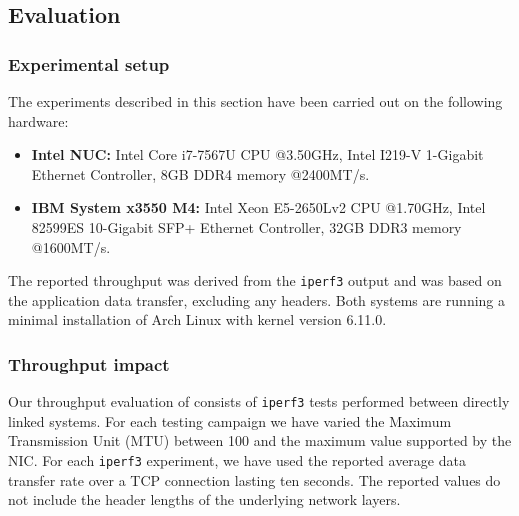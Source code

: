 \subsection{Evaluation}
\label{apffw:appscout:evaluation}


\subsubsection{Experimental setup}

The experiments described in this section have been carried out on the following hardware:

\begin{itemize}
    \item \textbf{Intel NUC:} Intel Core i7-7567U CPU @3.50GHz, Intel I219-V 1-Gigabit Ethernet Controller, 8GB DDR4 memory @2400MT/s.
    \item \textbf{IBM System x3550 M4:} Intel Xeon E5-2650Lv2 CPU @1.70GHz, Intel 82599ES 10-Gigabit SFP+ Ethernet Controller, 32GB DDR3 memory @1600MT/s.
\end{itemize}

The reported throughput was derived from the \texttt{iperf3} output and was based on the application data transfer, excluding any headers. Both systems are running a minimal installation of Arch Linux with kernel version 6.11.0.

\subsubsection{Throughput impact}

Our throughput evaluation of \scout{} consists of \texttt{iperf3} tests performed between directly linked systems. For each testing campaign we have varied the Maximum Transmission Unit (MTU) between 100 and the maximum value supported by the NIC. For each \texttt{iperf3} experiment, we have used the reported average data transfer rate over a TCP connection lasting ten seconds. The reported values do not include the header lengths of the underlying network layers.



